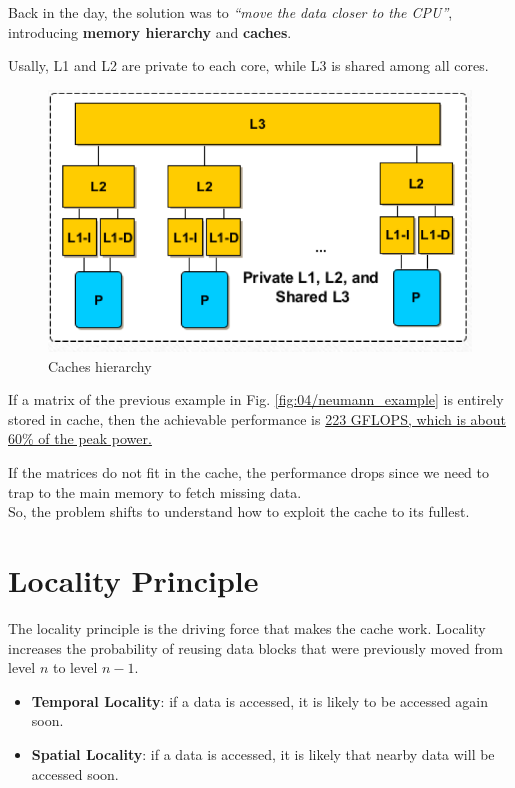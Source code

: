 \begin{paracol}{2}
   Back in the day, the solution was to \textit{``move the data closer to the CPU''}, introducing \textbf{memory hierarchy} and \textbf{caches}.

   Usally, L1 and L2 are private to each core, while L3 is shared among all cores.
   \switchcolumn
   
   \begin{figure}[htbp]
      \centering
      \includegraphics{images/04/caches_hierarchy.png}
      \caption{Caches hierarchy}
      \label{fig:04/caches_hierarchy}
   \end{figure}
\end{paracol}

If a matrix of the previous example in Fig. \ref{fig:04/neumann_example} is entirely stored in cache, then the achievable performance is \ul{223 GFLOPS, which is about 60\% of the peak power.}

If the matrices do not fit in the cache, the performance drops since we need to trap to the main memory to fetch missing data.\\
So, the problem shifts to understand how to exploit the cache to its fullest.

\section{Locality Principle}

The locality principle is the driving force that makes the cache work. Locality increases the probability of reusing data blocks that were previously moved from level $n$ to level $n-1$.
\begin{itemize}
   \item \textbf{Temporal Locality}: if a data is accessed, it is likely to be accessed again soon.
   \item \textbf{Spatial Locality}: if a data is accessed, it is likely that nearby data will be accessed soon.
\end{itemize}

